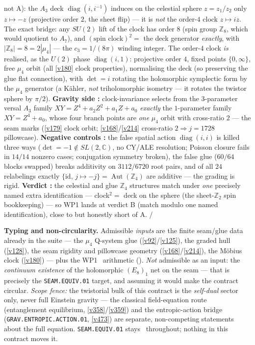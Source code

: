 \documentclass[11pt,a4paper]{article}
\newcommand{\cthree}{c_3}
\newcommand{\Z}{\mathbb Z}
\begin{document}
\begin{keybox}
{not A):} the $A_3$ deck $\operatorname{diag}(i,i^{-1})$ induces on the celestial sphere $z=z_1/z_2$ only
$z\mapsto-z$ (projective order $2$, the sheet flip) --- it is \emph{not} the order-$4$ clock $z\mapsto iz$.
The exact bridge: any $SU(2)$ lift of the clock has order $8$ (spin group $\Z_8$, which would quotient to
$A_7$), and $(\text{spin clock})^2=$ the deck generator \emph{exactly}, with $|\Z_8|=8=2|\mu_4|$ --- the
$\cthree=1/(8\pi)$ winding integer. The order-$4$ clock \emph{is} realised, as the $U(2)$ phase
$\operatorname{diag}(i,1)$: projective order $4$, fixed points $\{0,\infty\}$, free $\mu_4$ orbit (all
\vref{v180} clock properties), normalising the deck (so preserving the glue flat connection), with
$\det=i$ rotating the holomorphic symplectic form by the $\mu_4$ generator (a K\"ahler, \emph{not}
triholomorphic isometry --- it rotates the twistor sphere by $\pi/2$). \textbf{Gravity side \mE:}
clock-invariance selects from the $3$-parameter versal $A_3$ family $XY=Z^4{+}a_2Z^2{+}a_1Z{+}a_0$
\emph{exactly} the $1$-parameter family $XY=Z^4{+}a_0$, whose four branch points are \emph{one} $\mu_4$
orbit with cross-ratio $2$ --- the seam marks (\vref{v179} clock orbit; \vref{v168}/\vref{v214}
cross-ratio $2\Rightarrow j{=}1728$ pillowcase). \textbf{Negative controls \mE:} the false spatial action
$\operatorname{diag}(i,i)$ is killed three ways ($\det=-1\notin SL(2,\mathbb C)$, no CY/ALE resolution;
Poisson closure fails in $14/14$ nonzero cases; conjugation symmetry broken), the false glue ($60/64$
blocks swapped) breaks additivity on $3112/6720$ root pairs, and of all $24$ relabelings exactly
$\{\mathrm{id},\,j\mapsto-j\}=\operatorname{Aut}(\Z_4)$ are additive --- the grading is rigid.
\textbf{Verdict \mC:} the celestial and glue $\Z_4$ structures match under \emph{one} precisely named
extra identification --- clock$^2=$ deck on the sphere (the sheet-$\Z_2$ spin bookkeeping) --- so WP1
lands at verdict B (match modulo one named identification), close to but honestly short of A. \mE/\mC
\end{keybox}

\par\smallskip\noindent\textbf{Typing and non-circularity.} Admissible \emph{inputs} are the finite
seam/glue data already in the suite --- the $\mu_4$ Q-system glue (\vref{v92}/\vref{v125}), the graded hull
(\vref{v128}), the seam rigidity and pillowcase geometry (\vref{v168}/\vref{v214}), the M\"obius clock
(\vref{v180}) --- plus the WP1 \mE\ arithmetic (). \emph{Not}
admissible as an input: the \emph{continuum existence} of the holomorphic $(E_8)_1$ net on the seam ---
that is precisely the \texttt{SEAM.EQUIV.01} target, and assuming it would make the contract circular.
\emph{Scope fence:} the twistorial bulk of this contract is the \emph{self-dual} sector only, never full
Einstein gravity --- the classical field-equation route (entanglement equilibrium, \vref{v358}/\vref{v359})
and the entropic-action bridge (\texttt{GRAV.ENTROPIC.ACTION.01}, \vref{v473}) are separate, non-competing
statements about the full equation. \texttt{SEAM.EQUIV.01} stays \mO\ throughout; nothing in this contract
moves it.
\end{document}
